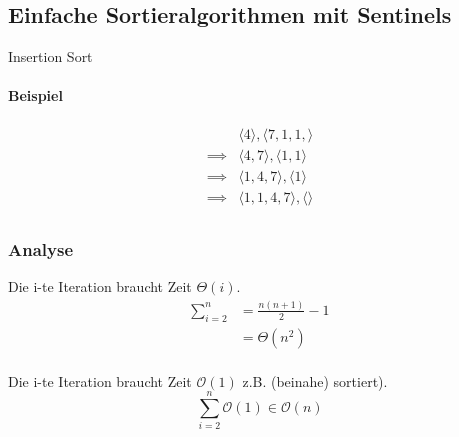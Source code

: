 \documentclass[a4paper]{scrartcl}
\begin{document}
	\subsection{Einfache Sortieralgorithmen mit Sentinels} 
	\begin{algorithm}
		\caption{Insertion Sort}
		\DontPrintSemicolon
		
	\end{algorithm}
	
	\paragraph{Beispiel}
	\begin{align*}
		& \langle 4 \rangle , \langle 7, 1, 1, \rangle\\
		\implies & \langle 4, 7 \rangle , \langle 1, 1 \rangle \\
		\implies & \langle 1, 4, 7 \rangle , \langle 1 \rangle \\
		\implies & \langle 1, 1, 4, 7  \rangle , \langle  \rangle \\
	\end{align*}
	
	\subsubsection{Analyse} 
	Die i-te Iteration braucht Zeit \( \Theta (i) \).\\
	\begin{align*}
		\sum_{i=2}^{n} &= \frac{n(n+1)}{2} -1 \\
		&= \Theta (n^2)\\
	\end{align*}
	
	Die i-te Iteration braucht Zeit \( \mathcal{O}(1) \) z.B. (beinahe) sortiert).
	\[ \sum_{i=2}^{n} \mathcal{O}(1) \in \mathcal{O}(n) \]
	
\end{document}
